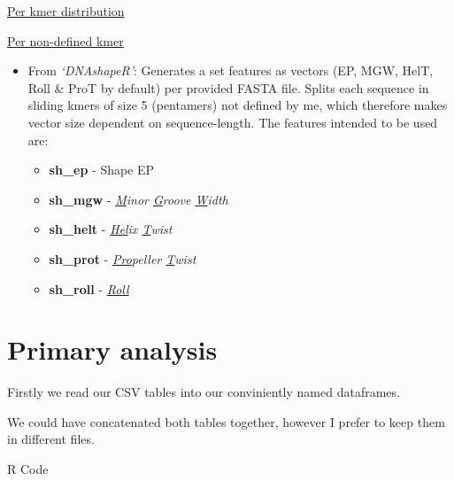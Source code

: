 \documentclass[
  letterpaper,
]{article}
\begin{document}
\underline{Per kmer distribution}

\underline{Per non-defined kmer}

\begin{itemize}
\item
  From \emph{`DNAshapeR'}: \newline Generates a set features as vectors
  (EP, MGW, HelT, Roll \& ProT by default) per provided FASTA file.
  Splits each sequence in sliding kmers of size 5 (pentamers) not
  defined by me, which therefore makes vector size dependent on
  sequence-length. The features intended to be used are:

  \begin{itemize}
  \item
    \color{red}\textbf{sh\_ep} \color{black} - Shape EP
  \item
    \color{red}\textbf{sh\_mgw} \color{black} -
    \textit{\underline{M}inor \underline{G}roove \underline{W}idth}
  \item
    \color{red}\textbf{sh\_helt} \color{black} -
    \textit{\underline{Hel}ix \underline{T}wist}
  \item
    \color{red}\textbf{sh\_prot} \color{black} -
    \textit{\underline{Pro}peller \underline{T}wist}
  \item
    \color{red}\textbf{sh\_roll} \color{black} -
    \textit{\underline{Roll}}
  \end{itemize}
\end{itemize}

\section{Primary analysis}\label{primary-analysis}

Firstly we read our CSV tables into our conviniently named dataframes.

We could have concatenated both tables together, however I prefer to
keep them in different files.

\begin{rheader}
R Code
\end{rheader}
\vspace{-1.75pt}
\end{document}
